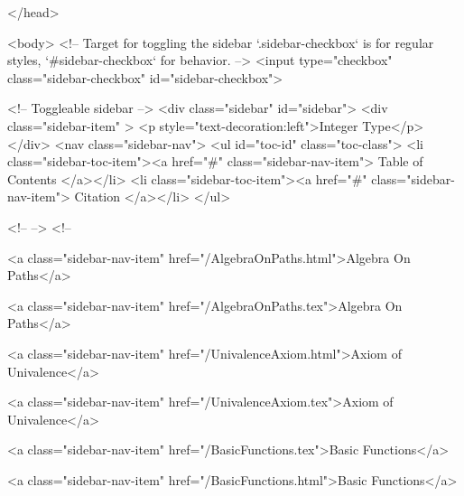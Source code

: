   
</head>




  <body>
    <!-- Target for toggling the sidebar `.sidebar-checkbox` is for regular
     styles, `#sidebar-checkbox` for behavior. -->
<input type="checkbox" class="sidebar-checkbox" id="sidebar-checkbox">

<!-- Toggleable sidebar -->
<div class="sidebar" id="sidebar">
  <div class="sidebar-item" >
    <p style="text-decoration:left">Integer Type</p>
  </div>
  <nav class="sidebar-nav">
    <ul id="toc-id" class="toc-class">
  <li class="sidebar-toc-item"><a href="#" class="sidebar-nav-item"> Table of Contents </a></li>
  <li class="sidebar-toc-item"><a href="#" class="sidebar-nav-item"> Citation </a></li>
</ul>


    <!--  -->
    <!-- 
      
    
      
    
      
    
      
        
      
    
      
        
          <a class="sidebar-nav-item" href="/AlgebraOnPaths.html">Algebra On Paths</a>
        
      
    
      
        
          <a class="sidebar-nav-item" href="/AlgebraOnPaths.tex">Algebra On Paths</a>
        
      
    
      
        
          <a class="sidebar-nav-item" href="/UnivalenceAxiom.html">Axiom of Univalence</a>
        
      
    
      
        
          <a class="sidebar-nav-item" href="/UnivalenceAxiom.tex">Axiom of Univalence</a>
        
      
    
      
        
          <a class="sidebar-nav-item" href="/BasicFunctions.tex">Basic Functions</a>
        
      
    
      
        
          <a class="sidebar-nav-item" href="/BasicFunctions.html">Basic Functions</a>
        
      
    
      
        
